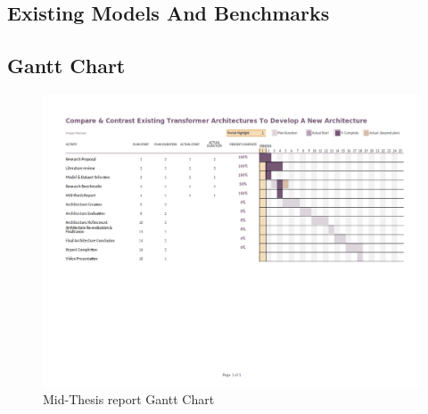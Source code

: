 \documentclass[a4paper,12pt]{report}
\begin{document}
    \section{Existing Models And Benchmarks}\label{c33}
    \begin{appendices}
    	\chapter{Gantt Chart}\label{cgc}
    \begin{figure}[!h]
       	\centering
        \includegraphics[scale=0.55,angle=90]{../images/GanttChart-mid.png}
     	\caption{Mid-Thesis report Gantt Chart}\label{ganttChartMid}
    \end{figure}
    \end{appendices}

\end{document}
